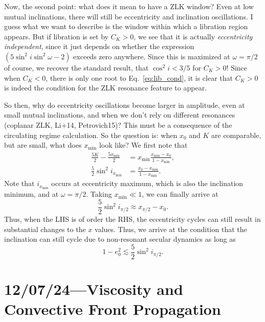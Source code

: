 \documentclass[12pt]{article}
\begin{document}
Now, the second point: what does it mean to have a ZLK window? Even at low
mutual inclinations, there will still be eccentricity and inclination
oscillations.
I guess what we want to describe is the window within which a libration region
appears.
But if libration is set by $C_K > 0$, we see that it is actually
\emph{eccentricity independent}, since it just depends on whether the expression
$(5\sin^2i\sin^2\omega - 2)$ exceeds zero anywhere.
Since this is maximized at $\omega = \pi/2$ of course, we recover the standard
result, that $\cos^2i < 3/5$ for $C_K > 0$!
Since when $C_K < 0$, there is only one root to Eq.~\eqref{eq:lib_cond}, it is
clear that $C_K > 0$ is indeed the condition for the ZLK resonance feature to
appear.

So then, why do eccentricity oscillations become larger in amplitude, even at
small mutual inclinations, and when we don't rely on different resonances
(coplanar ZLK, Li+14, Petrovich15)?
This must be a consequence of the circulating regime calculation.
So the question is: when $x_0$ and $K$ are comparable, but are small, what does
$x_{\min}$ look like?
We first note that
\begin{align}
    \frac{5K}{2} - \frac{5x_{\min}}{2}
        &= x_{\min}\frac{x_{\min} - x_0}{1 - x_{\min}},\\
    \frac{5}{2}\sin^2 i_{x_{\min}}
        &= \frac{x_0 - x_{\min}}{1 - x_{\min}}.
\end{align}
Note that $i_{x_{\min}}$ occurs at eccentricity maximum, which is also the
inclination minimum, and at $\omega = \pi/2$. Taking $x_{\min} \ll 1$, we can
finally arrive at
\begin{equation}
    \frac{5}{2}\sin^2 i_{\pi/2}
        \approx x_{\pi/2} - x_0.
\end{equation}
Thus, when the LHS is of order the RHS, the eccentricity cycles can still result
in substantial changes to the $x$ values. Thus, we arrive at the condition that
the inclination can still cycle due to non-resonant secular dynamics as long as
\begin{equation}
    1 - e_0^2 \lesssim \frac{5}{2}\sin^2 i_{\pi/2}.
\end{equation}

\section{12/07/24---Viscosity and Convective Front Propagation}
\end{document}
